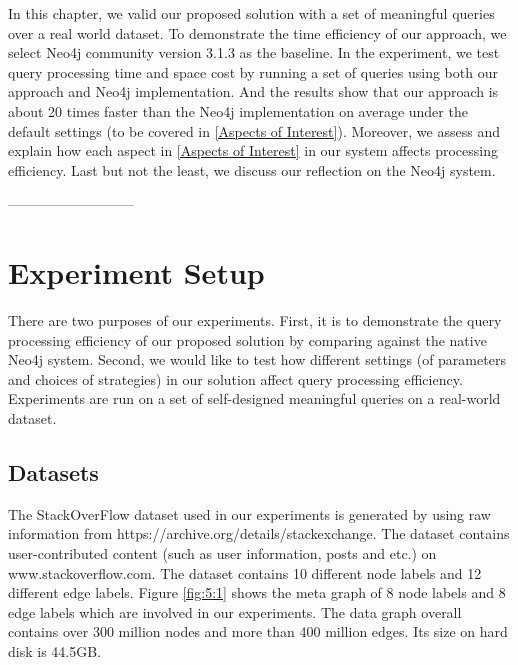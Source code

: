 In this chapter, we valid our proposed solution with a set of meaningful queries over a real world dataset. To demonstrate the time efficiency of our approach, we select Neo4j community version 3.1.3 as the baseline. In the experiment, we test query processing time and space cost by running a set of queries using both our approach and Neo4j implementation. And the results show that our approach is about 20 times faster than the Neo4j implementation on average under the default settings (to be covered in \ref{Aspects of Interest}). Moreover, we assess and explain how each aspect in \ref{Aspects of Interest} in our system affects processing efficiency. Last but not the least, we discuss our reflection on the Neo4j system.

---------------------------
\section{Experiment Setup}


There are two purposes of our experiments. First, it is to demonstrate the query processing efficiency of our proposed solution by comparing against the native Neo4j system. Second, we would like to test how different settings (of parameters and choices of strategies) in our solution affect query processing efficiency. Experiments are run on a set of self-designed meaningful queries on a real-world dataset.

\subsection{Datasets}

The StackOverFlow dataset used in our experiments is generated by using raw information from https://archive.org/details/stackexchange. The dataset contains user-contributed content (such as user information, posts and etc.) on www.stackoverflow.com. The dataset contains 10 different node labels and 12 different edge labels.  Figure \ref{fig:5:1} shows the meta graph of 8 node labels and 8 edge labels which are involved in our experiments. The data graph overall contains over 300 million nodes and more than 400 million edges. Its size on hard disk is 44.5GB.
\par

